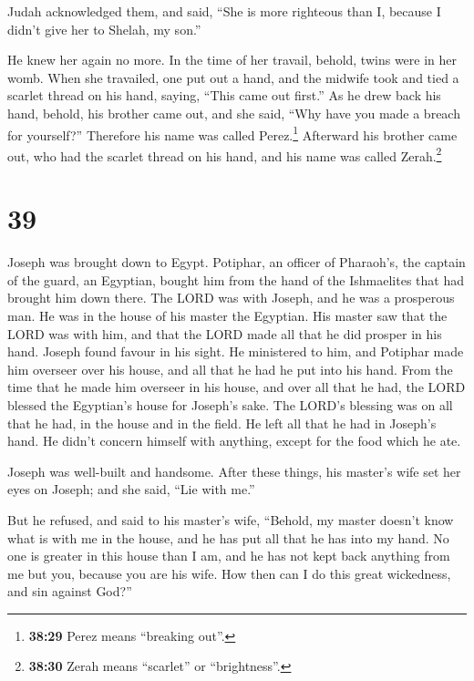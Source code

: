  Judah acknowledged them, and said, ``She is more
righteous than I, because I didn't give her to Shelah, my son.''

He knew her again no more.  In the time of her travail,
behold, twins were in her womb.  When she travailed, one
put out a hand, and the midwife took and tied a scarlet thread on his
hand, saying, ``This came out first.''  As he drew back
his hand, behold, his brother came out, and she said, ``Why have you
made a breach for yourself?'' Therefore his name was called
Perez.\footnote{\textbf{38:29} Perez means ``breaking out''.}
 Afterward his brother came out, who had the scarlet
thread on his hand, and his name was called Zerah.\footnote{\textbf{38:30}
  Zerah means ``scarlet'' or ``brightness''.}

\hypertarget{section-38}{%
\section{39}\label{section-38}}

 Joseph was brought down to Egypt. Potiphar, an officer of
Pharaoh's, the captain of the guard, an Egyptian, bought him from the
hand of the Ishmaelites that had brought him down there. 
The LORD was with Joseph, and he was a prosperous man. He was in the
house of his master the Egyptian.  His master saw that the
LORD was with him, and that the LORD made all that he did prosper in his
hand.  Joseph found favour in his sight. He ministered to
him, and Potiphar made him overseer over his house, and all that he had
he put into his hand.  From the time that he made him
overseer in his house, and over all that he had, the LORD blessed the
Egyptian's house for Joseph's sake. The LORD's blessing was on all that
he had, in the house and in the field.  He left all that
he had in Joseph's hand. He didn't concern himself with anything, except
for the food which he ate.

Joseph was well-built and handsome.  After these things,
his master's wife set her eyes on Joseph; and she said, ``Lie with me.''

 But he refused, and said to his master's wife, ``Behold,
my master doesn't know what is with me in the house, and he has put all
that he has into my hand.  No one is greater in this house
than I am, and he has not kept back anything from me but you, because
you are his wife. How then can I do this great wickedness, and sin
against God?''

